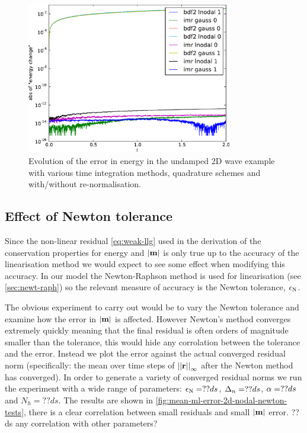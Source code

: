 \begin{figure}
  \centering
  \includegraphics[width=0.8\textwidth]{plots/2d_wave_solution_energy/absofenergychangevstimes}
  \caption{Evolution of the error in energy in the undamped 2D wave example with various time integration methods, quadrature schemes and with/without re-normalisation.}
  \label{fig:energy-error-2d}
\end{figure}



\subsection{Effect of Newton tolerance}
\label{sec:effect-newt-toler-m-conservation}

Since the non-linear residual \cref{eq:weak-llg} used in the derivation of the conservation properties for energy and $\left|{\boldsymbol{\mathrm{m}}} \right|$ is only true up to the accuracy of the linearisation method we would expect to see some effect when modifying this accuracy.
In our model the Newton-Raphson method is used for linearisation (see \cref{sec:newt-raph}) so the relevant measure of accuracy is the Newton tolerance, $\epsilon_{\mathrm{N}}$.

The obvious experiment to carry out would be to vary the Newton tolerance and examine how the error in $\left|{\boldsymbol{\mathrm{m}}} \right|$ is affected.
However Newton's method converges extremely quickly meaning that the final residual is often orders of magnitude smaller than the tolerance, this would hide any corrolation between the tolerance and the error.
Instead we plot the error against the actual converged residual norm (specifically: the mean over time steps of $\left| \left| \boldsymbol{\mathrm{r}} \right| \right|_\infty$ after the Newton method has converged).
In order to generate a variety of converged residual norms we run the experiment with a wide range of parameters: $\epsilon_{\mathrm{N}} = ??ds$, $\Delta_{n} = ??ds$, $\alpha = ??ds$ and $N_h = ??ds$.
The results are shown in \cref{fig:mean-ml-error-2d-nodal-newton-tests}, there is a clear correlation between small residuals and small $\left|{\boldsymbol{\mathrm{m}}} \right|$ error.
??ds any correlation with other parameters?

